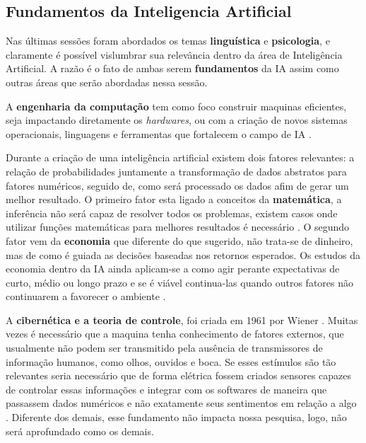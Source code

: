 \subsection{Fundamentos da Inteligencia Artificial}
Nas últimas sessões foram abordados os temas \textbf{linguística} e \textbf{psicologia}, e claramente é possível vislumbrar sua relevância dentro da área de Inteligência Artificial. A razão é o fato de ambas serem \textbf{fundamentos} da IA assim como outras áreas que serão abordadas nessa sessão.

A \textbf{engenharia da computação} tem como foco construir maquinas eficientes, seja impactando diretamente os \textit{hardwares}, ou com a criação de novos sistemas operacionais, linguagens e ferramentas que fortalecem o campo de IA \cite[13-14]{russell2003artificial}.

Durante a criação de uma inteligência artificial existem dois fatores relevantes: a relação de probabilidades juntamente a transformação de dados abstratos para fatores numéricos, seguido de, como será processado os dados afim de gerar um melhor resultado. O primeiro fator esta ligado a conceitos da \textbf{matemática}, a inferência não será capaz de resolver todos os problemas, existem casos onde utilizar funções matemáticas para melhores resultados é necessário \cite{boole1854investigation}. O segundo fator vem da \textbf{economia} que diferente do que sugerido, não trata-se de dinheiro, mas de como é guiada as decisões baseadas nos retornos esperados. Os estudos da economia dentro da IA ainda aplicam-se a como agir perante expectativas de curto, médio ou longo prazo e se é viável continua-las quando outros fatores não continuarem a favorecer o ambiente \cite[9]{russell2003artificial}.

A \textbf{cibernética e a teoria de controle}, foi criada em 1961 por Wiener \cite[15]{russell2003artificial}. Muitas vezes é necessário que a maquina tenha conhecimento de fatores externos, que usualmente não podem ser transmitido pela ausência de transmissores de informação humanos, como olhos, ouvidos e boca. Se esses estímulos são tão relevantes seria necessário que de forma elétrica fossem criados sensores capazes de controlar essas informações e integrar com os softwares de maneira que passassem dados numéricos e não exatamente seus sentimentos em relação a algo \cite[3-7]{wiener1961cybernetics}. Diferente dos demais, esse fundamento não impacta nossa pesquisa, logo, não será aprofundado como os demais.

